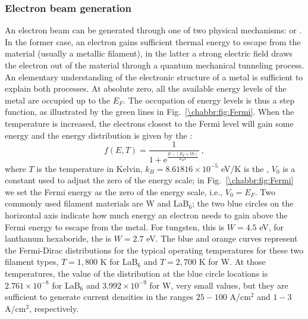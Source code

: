 \subsubsection{Electron beam generation}

An electron beam can be generated through one of two physical mechanisms:  or .  In the former case, an electron gains sufficient thermal energy to escape from the material (usually a metallic filament), in the latter a strong electric field draws the electron out of the material through a quantum mechanical tunneling process.  An elementary understanding of the electronic structure of a metal is sufficient to explain both processes.  At absolute zero, all the available energy levels of the metal are occupied up to the  $E_F$.  The occupation of energy levels is thus a step function, as illustrated by the green lines in Fig.~\ref{\chabbr:fig:Fermi}.  When the temperature is increased, the electrons closest to the Fermi level will gain some energy and the energy distribution is given by the :
\begin{equation}
	f(E,T) = \frac{1}{1+\mathrm{e}^{\frac{E-(E_F+V0)}{k_BT}}}\ ,\label{\chabbr:eq:FermiDirac}
\end{equation}
where $T$ is the temperature in Kelvin, $k_B=8.61816\times 10^{-5}$ eV/K is the , $V_0$ is a constant used to adjust the zero of the energy scale; in Fig.~\ref{\chabbr:fig:Fermi} we set the Fermi energy as the zero of the energy scale, i.e., $V_0=E_F$.  Two commonly used filament materials are W and  LaB$_6$; the two blue circles on the horizontal axis indicate how much energy an electron needs to  gain above the Fermi energy to escape from the metal. For tungsten, this is $W=4.5$ eV, for lanthanum hexaboride, the  is $W=2.7$ eV.  The blue and orange curves represent the Fermi-Dirac distributions for the typical operating temperatures for these two filament types, $T=1,800$ K for LaB$_6$ and $T=2,700$ K for W. At those temperatures, the value of the distribution at the blue circle locations is $2.761\times 10^{-8}$ for LaB$_6$ and $3.992\times 10^{-9}$ for W, very small values, but they are sufficient to generate current densities in the ranges $25-100$ A/cm$^2$ and $1-3$ A/cm$^2$, respectively.


